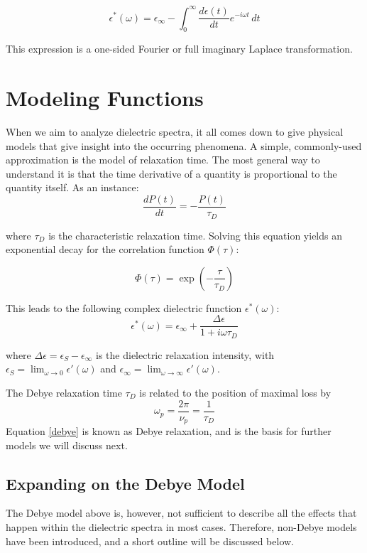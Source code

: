\[
\epsilon^*(\omega) = \epsilon_\infty - \int_{0}^{\infty} \frac{d\epsilon(t)}{dt} e^{-i\omega t} \, dt
\]

This expression is a one-sided Fourier or full imaginary Laplace transformation.

\section{Modeling Functions}

When we aim to analyze dielectric spectra, it all comes down to give physical models that give insight into the occurring phenomena. A simple, commonly-used approximation is the model of relaxation time. The most general way to understand it is that the time derivative of a quantity is proportional to the quantity itself. As an instance:
\[
\frac{dP(t)}{dt} = -\frac{P(t)}{\tau_D}
\]

where \( \tau_D \) is the characteristic relaxation time. Solving this equation yields an exponential decay for the correlation function \( \Phi(\tau) \):

\[
\Phi(\tau) = \exp\left(-\frac{\tau}{\tau_D}\right)
\]

This leads to the following complex dielectric function \( \epsilon^*(\omega) \):
\begin{equation}
\label{debye}
\epsilon^*(\omega) = \epsilon_\infty + \frac{\Delta \epsilon}{1 + i \omega \tau_D}
\end{equation}

where \( \Delta \epsilon = \epsilon_S - \epsilon_\infty \) is the dielectric relaxation intensity, with \( \epsilon_S = \lim_{\omega \to 0} \epsilon'(\omega) \) and \( \epsilon_\infty = \lim_{\omega \to \infty} \epsilon'(\omega) \).

The Debye relaxation time \( \tau_D \) is related to the position of maximal loss by
\begin{equation}
\omega_p = \frac{2\pi}{\nu_p} = \frac{1}{\tau_D}
\label{relaxation_freq_relation}
\end{equation}
Equation \ref{debye} is known as Debye relaxation, and is the basis for further models we will discuss next.
\subsection{Expanding on the Debye Model}
The Debye model above is, however, not sufficient to describe all the effects that happen within the dielectric spectra in most cases. Therefore, non-Debye models have been introduced, and a short outline will be discussed below.

